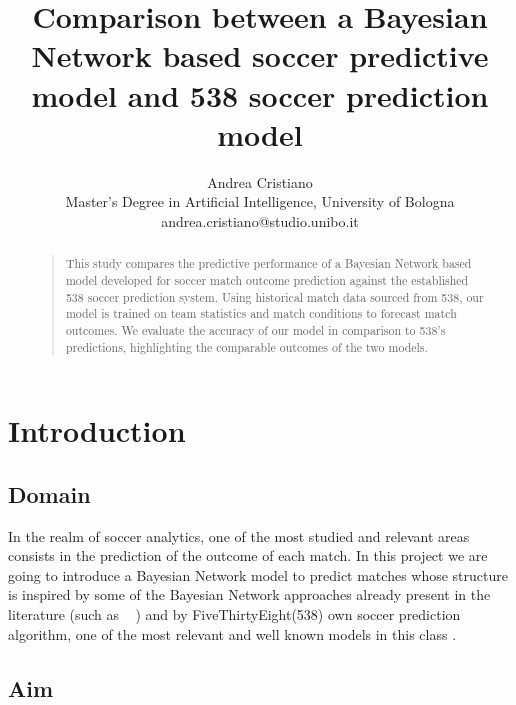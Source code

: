 \documentclass[letterpaper]{article}
\begin{document}
%
\title{Comparison between a Bayesian Network based soccer predictive model and 538 soccer prediction model}
\author{Andrea Cristiano\\
Master's Degree in Artificial Intelligence, University of Bologna\\
andrea.cristiano@studio.unibo.it
}
\maketitle




\begin{abstract}
\begin{quote}

This study compares the predictive performance of a Bayesian Network based model developed for soccer match outcome prediction against the established 538 soccer prediction system. Using historical match data sourced from 538, our model is trained on team statistics and match conditions to forecast match outcomes. We evaluate the accuracy  of our model in comparison to 538's predictions, highlighting the comparable outcomes of the two models.


\end{quote}
\end{abstract}


\section{Introduction}
\subsection{Domain}

In the realm of soccer analytics, one of the most studied and relevant areas consists in the prediction of the outcome of each match. In this project we are going to introduce a Bayesian Network model to predict matches whose structure is inspired by some of the Bayesian Network approaches already present in the literature (such as ~\cite{article1} \cite{BayesianBarca}) and by FiveThirtyEight(538) own soccer prediction algorithm, one of the most relevant and well known models in this class \cite{538Website}.


\subsection{Aim}
\end{document}
